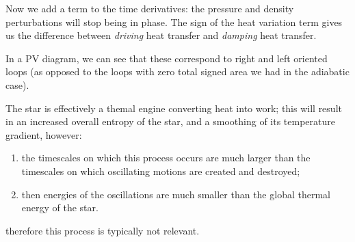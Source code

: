 \documentclass[main.tex]{subfiles}
\begin{document}
Now we add a term to the time derivatives: the pressure and density perturbations will stop being in phase. The sign of the heat variation term gives us the difference between \emph{driving} heat transfer and \emph{damping} heat transfer.

In a PV diagram, we can see that these correspond to right and left oriented loops (as opposed to the loops with zero total signed area we had in the adiabatic case).

\begin{bluebox}
    The star is effectively a themal engine converting heat into work; this will result in an increased overall entropy of the star, and a smoothing of its temperature gradient, however:
    \begin{enumerate}
        \item the timescales on which this process occurs are much larger than the timescales on which oscillating motions are created and destroyed;
        \item then energies of the oscillations are much smaller than the global thermal energy of the star.
    \end{enumerate}
    therefore this process is typically not relevant.
\end{bluebox}
\end{document}
